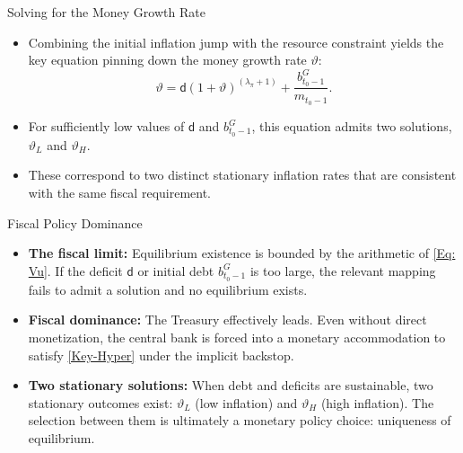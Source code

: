 \documentclass[11pt,aspectratio=169]{beamer}
\begin{document}
\begin{frame}{Solving for the Money Growth Rate}
\small
\begin{itemize}
    \item Combining the initial inflation jump with the resource constraint yields the key equation pinning down the money growth rate \(\vartheta\):
    \begin{equation}
    \vartheta
    =\mathsf{d}(1+\vartheta )^{(\lambda _{\pi }+1)}
    +\frac{b_{t_{0}-1}^{G}}{m_{t_{0}-1}}.
    \label{Eq: Vu}
    \end{equation}

    \item For sufficiently low values of \(\mathsf{d}\) and \(b_{t_0-1}^{G}\), this equation admits two solutions, \(\vartheta_{L}\) and \(\vartheta_{H}\).
    \item These correspond to two distinct stationary inflation rates that are consistent with the same fiscal requirement.
\end{itemize}
\end{frame}

\begin{frame}{Fiscal Policy Dominance}
\small
\begin{itemize}
    \item \textbf{The fiscal limit:} Equilibrium existence is bounded by the arithmetic of \eqref{Eq: Vu}. If the deficit \(\mathsf{d}\) or initial debt \(b_{t_0-1}^{G}\) is too large, the relevant mapping fails to admit a solution and no equilibrium exists.

    \item \textbf{Fiscal dominance:} The Treasury effectively leads. Even without direct monetization, the central bank is forced into a monetary accommodation to satisfy \eqref{Key-Hyper} under the implicit backstop.

    \item \textbf{Two stationary solutions:} When debt and deficits are sustainable, two stationary outcomes exist: \(\vartheta_L\) (low inflation) and \(\vartheta_H\) (high inflation). The selection between them is ultimately a monetary policy choice: uniqueness of equilibrium.
\end{itemize}
\end{frame}
\end{document}
